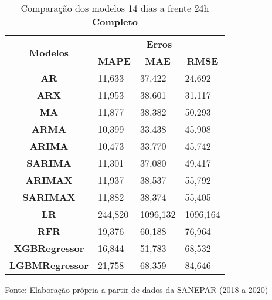 \begin{table}[H]
	\centering
	\caption{Comparação dos modelos 14 dias a frente 24h \textbf{Completo} }\label{tb:30-24cm}
	\begin{tabular}{@{}clll@{}}
		\toprule
		\multirow{2}{*}{\textbf{Modelos}} & \multicolumn{3}{c}{\textbf{Erros}}                                                                       \\ \cmidrule(l){2-4} 
		& \multicolumn{1}{c}{\textbf{MAPE}} & \multicolumn{1}{c}{\textbf{MAE}} & \multicolumn{1}{c}{\textbf{RMSE}} \\ \hline
\textbf{AR}                       & 11,633                            & 37,422                           & 24,692                            \\
\textbf{ARX}                      & 11,953                            & 38,601                           & 31,117                            \\
\textbf{MA}                       & 11,877                            & 38,382                           & 50,293                            \\
\textbf{ARMA}                     & 10,399                            & 33,438                           & 45,908                            \\
\textbf{ARIMA}                    & 10,473                            & 33,770                           & 45,742                            \\
\textbf{SARIMA}                   & 11,301                            & 37,080                           & 49,417                            \\
\textbf{ARIMAX}                   & 11,937                            & 38,537                           & 55,792                            \\
\textbf{SARIMAX}                  & 11,882                            & 38,374                           & 55,405                            \\
\textbf{LR}        & 244,820                           & 1096,132                         & 1096,164                          \\
\textbf{RFR}  & 19,376                            & 60,188                           & 76,964                            \\
\textbf{XGBRegressor}             & 16,844                            & 51,783                           & 68,532                            \\
\textbf{LGBMRegressor}            & 21,758                            & 68,359                           & 84,646                            \\ \bottomrule
	\end{tabular}

Fonte: Elaboração própria a partir de dados da SANEPAR (2018 a 2020)
\end{table}


